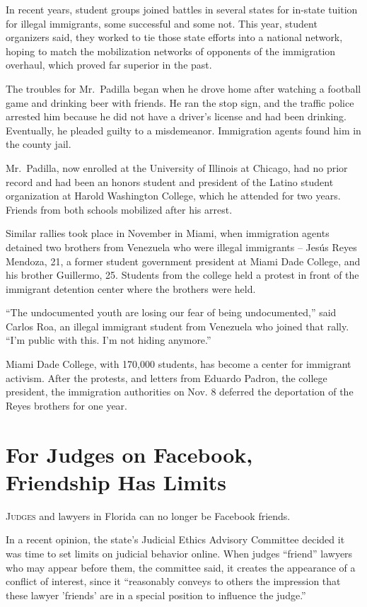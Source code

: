 ﻿\documentclass[12pt]{article}
\begin{document}
In recent years, student groups joined battles in several states for in-state tuition for illegal
immigrants, some successful and some not. This year, student organizers said, they worked to tie
those state efforts into a national network, hoping to match the mobilization networks of opponents
of the immigration overhaul, which proved far superior in the past.

The troubles for Mr.~Padilla began when he drove home after watching a football game and drinking
beer with friends. He ran the stop sign, and the traffic police arrested him because he did not have
a driver's license and had been drinking. Eventually, he pleaded guilty to a misdemeanor.
Immigration agents found him in the county jail.

Mr.~Padilla, now enrolled at the University of Illinois at Chicago, had no prior record and had been
an honors student and president of the Latino student organization at Harold Washington College,
which he attended for two years. Friends from both schools mobilized after his arrest.

Similar rallies took place in November in Miami, when immigration agents detained two brothers from
Venezuela who were illegal immigrants -- Jesús Reyes Mendoza, 21, a former student government
president at Miami Dade College, and his brother Guillermo, 25. Students from the college held a
protest in front of the immigrant detention center where the brothers were held.

``The undocumented youth are losing our fear of being undocumented,'' said Carlos Roa, an illegal
immigrant student from Venezuela who joined that rally. ``I'm public with this. I'm not hiding
anymore.''

Miami Dade College, with 170,000 students, has become a center for immigrant activism. After the
protests, and letters from Eduardo Padron, the college president, the immigration authorities on
Nov. 8 deferred the deportation of the Reyes brothers for one year.

\section{For Judges on Facebook, Friendship Has Limits}

\lettrine{J}{udges} and lawyers in Florida can no longer be Facebook
friends.

In a recent opinion, the state's Judicial Ethics Advisory Committee decided it was time to set
limits on judicial behavior online. When judges ``friend'' lawyers who may appear before them, the
committee said, it creates the appearance of a conflict of interest, since it ``reasonably conveys
to others the impression that these lawyer 'friends' are in a special position to influence the
judge.''
\end{document}
